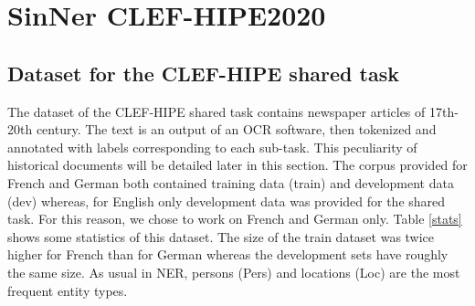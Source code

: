 \chapter{SinNer CLEF-HIPE2020}

\section{Dataset for the CLEF-HIPE shared task}
\label{sec:dataset}

The dataset of the CLEF-HIPE shared task contains newspaper articles of 17th-20th century. The text is an output of an OCR software, then tokenized and annotated with labels corresponding to each sub-task. This peculiarity of historical documents will be detailed later in this section.
The corpus provided for French and German both contained training data (train) and development data (dev) whereas, for English only development data was provided for the shared task. For this reason, we chose to work on French and German only.
Table \ref{stats} shows some statistics of this dataset. The size of the train dataset was twice higher for French than for German whereas the development sets have roughly the same size. As usual in NER, persons (Pers) and locations (Loc) are the most frequent entity types.


